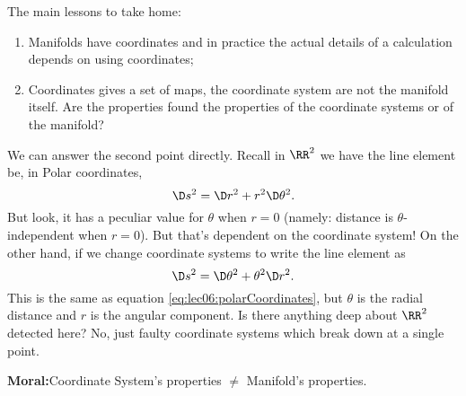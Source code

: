 
The main lessons to take home:
\begin{enumerate}
\item Manifolds have coordinates and in practice the actual
  details of a calculation depends on using coordinates;
\item Coordinates gives a set of maps, the coordinate system are
  not the manifold itself. Are the properties found the properties of the
  coordinate systems or of the manifold?
\end{enumerate}
We can answer the second point directly. Recall in $\RR^2$ we
have the line element be, in Polar coordinates,
\begin{equation}\label{eq:lec06:polarCoordinates}
\D s^{2}=\D r^{2}+r^{2}\D\theta^{2}.
\end{equation}
But look, it has a peculiar value for $\theta$ when $r=0$
(namely: distance is $\theta$-independent when $r=0$). But that's
dependent on the coordinate system! On the other hand, if we
change coordinate systems to write the line element as
\begin{equation}
\D s^{2}=\D\theta^{2}+\theta^{2}\D r^{2}.
\end{equation}
This is the same as equation \eqref{eq:lec06:polarCoordinates},
but $\theta$ is the radial distance and $r$ is the angular
component. Is there anything deep about $\RR^2$ detected here?
No, just faulty coordinate systems which break down at a single
point. 

\medskip
{\bf Moral:\quad}\ignorespaces Coordinate System's properties
$\not=$ Manifold's properties.


